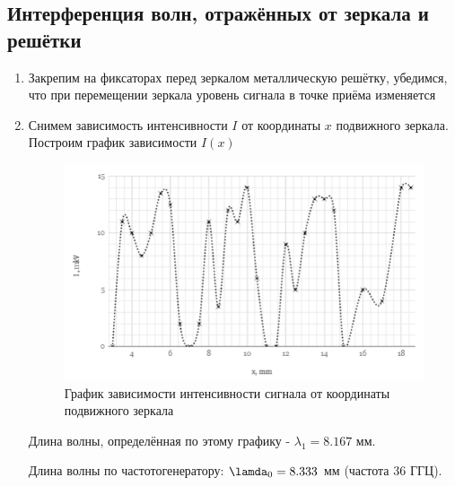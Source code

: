 \documentclass[a4paper]{article}
\begin{document}
\subsection{Интерференция волн, отражённых от зеркала и решётки}
\begin{enumerate}
    \item Закрепим на фиксаторах перед зеркалом металлическую решётку, убедимся, что при перемещении зеркала уровень сигнала в точке приёма изменяется
    \item Снимем зависимость интенсивности $I$ от координаты $x$ подвижного зеркала. Построим график зависимости $I(x)$
    
\begin{figure}[h]
    \centering
    \includegraphics[width=14cm]{graph1.PNG}
    \caption{График зависимости интенсивности сигнала от координаты подвижного зеркала}
    \label{fig:vac}
\end{figure}

Длина волны, определённая по этому графику - $\lambda_1 = 8.167$ мм. \par
Длина волны по частотогенератору: $\lamda_0 = 8.333$ мм (частота 36 ГГЦ).
\end{enumerate}
\end{document}
